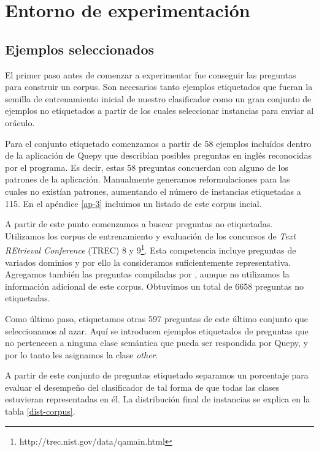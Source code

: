 

\chapter{Entorno de experimentación}

\section{Ejemplos seleccionados}\label{descripcion-corpus}

El primer paso antes de comenzar a experimentar fue conseguir las preguntas para construir un corpus. Son necesarios tanto ejemplos etiquetados que fueran la semilla de entrenamiento inicial de nuestro clasificador como un gran conjunto de ejemplos no etiquetados a partir de los cuales seleccionar instancias para enviar al oráculo.

Para el conjunto etiquetado comenzamos a partir de 58 ejemplos incluídos dentro de la aplicación de Quepy que describían posibles preguntas en inglés reconocidas por el programa. Es decir, estas 58 preguntas concuerdan con alguno de los patrones de la aplicación. Manualmente generamos reformulaciones para las cuales no existían patrones, aumentando el número de instancias etiquetadas a 115. En el apéndice \ref{ap-3} incluimos un listado de este corpus incial.

A partir de este punto comenzamos a buscar preguntas no etiquetadas. Utilizamos los corpus de entrenamiento y evaluación de los concursos de \textit{Text REtrieval Conference} (TREC) 8 y 9\footnote{http://trec.nist.gov/data/qamain.html}. Esta competencia incluye preguntas de variados dominios y por ello la consideramos suficientemente representativa. Agregamos también las preguntas compiladas por \citet{corpus-stanford}, aunque no utilizamos la información adicional de este corpus. Obtuvimos un total de 6658 preguntas no etiquetadas.

Como último paso, etiquetamos otras 597 preguntas de este último conjunto que seleccionamos al azar. Aquí se introducen ejemplos etiquetados de preguntas que no pertenecen a ninguna clase semántica que pueda ser respondida por Quepy, y por lo tanto les asignamos la clase \textit{other}.

A partir de este conjunto de preguntas etiquetado separamos un porcentaje para evaluar el desempeño del clasificador de tal forma de que todas las clases estuvieran representadas en él. La distribución final de instancias se explica en la tabla \ref{dist-corpus}.

